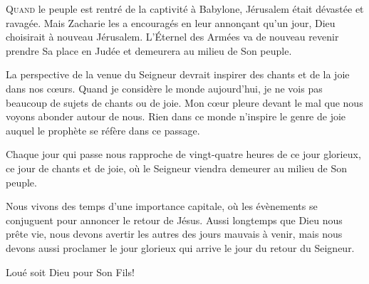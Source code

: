


\lettrine{Q}{uand} le peuple est rentré de la captivité à Babylone,
 Jérusalem était dévastée et ravagée. Mais Zacharie les a encouragés
 en leur annon\c{c}ant qu'un jour, Dieu choisirait à nouveau Jérusalem.
 L'Éternel des Armées va de nouveau revenir prendre Sa place en Judée
 et demeurera au milieu de Son peuple. 


La perspective de la venue du Seigneur devrait inspirer des chants
 et de la joie dans nos c\oe{}urs. Quand je considère le monde aujourd'hui,
 je ne vois pas beaucoup de sujets de chants ou de joie.
 Mon c\oe{}ur pleure devant le mal que nous voyons abonder autour de nous.
 Rien dans ce monde n'inspire le genre de joie auquel le prophète
 se réfère dans ce passage. 

Chaque jour qui passe nous rapproche de vingt-quatre heures de ce jour
 glorieux, ce jour de chants et de joie, où le Seigneur viendra demeurer
 au milieu de Son peuple. 

Nous vivons des temps d'une importance capitale, où les évènements
 se conjuguent pour annoncer le retour de Jésus. Aussi longtemps que Dieu
 nous prête vie, nous devons avertir les autres des jours mauvais à venir,
 mais nous devons aussi proclamer le jour glorieux qui arrive
 \ocadr le jour du retour du Seigneur. 

Loué soit Dieu pour Son Fils! 

\dvrule





